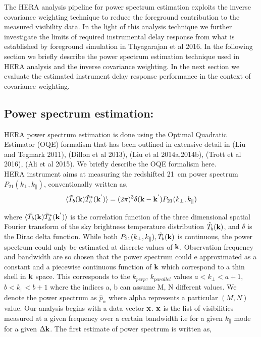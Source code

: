 \documentclass[twocolumn]{emulateapj}
\begin{document}
The HERA analysis pipeline for power spectrum estimation exploits the inverse covariance weighting technique to reduce the foreground contribution to the measured visibility data. In the light of this analysis technique we further investigate the limits of required instrumental delay response from what is established by foreground simulation in Thyagarajan et al 2016. In the following section we briefly describe the power spectrum estimation technique used in HERA analysis and the inverse covariance weighting. In the next section we evaluate the estimated instrument delay response performance in the context of covariance weighting.

\subsection{Power spectrum estimation:}
HERA power spectrum estimation is done using the Optimal Quadratic Estimator (OQE) formalism that has been outlined in extensive detail in (Liu and Tegmark 2011), (Dillon et al 2013), (Liu et al 2014a,2014b), (Trott et al 2016), (Ali et al 2015). We briefly  describe the OQE formalism here.\\
HERA instrument aims at measuring the redshifted 21~cm power spectrum $P_{21}(k_\perp,k_\parallel)$, conventionally written as, 
\begin{equation}
\langle  \tilde T_{b}(\bold k) \tilde T_{b}^{*}(\bold k^{'}) \rangle = (2\pi)^{3} \delta (\bold k - \bold k^{'})P_{21}(k_\perp,k_\parallel)
\end{equation}

where $\langle  \tilde T_{b}(\bold k) \tilde T_{b}^{*}(\bold k^{'}) \rangle $ is the correlation function of the three dimensional spatial Fourier transform of the sky brightness temperature distribution $ \tilde T_{b}(\bold k)$, and $\delta$ is the Dirac delta function. While both $P_{21}(k_\perp,k_\parallel), \tilde T_{b}({\bold k})$ is continuous, the power spectrum could only be estimated at discrete values of $\bold k$. Observation frequency and bandwidth are so chosen that the power spectrum could e approximated as a constant and a piecewise continuous function of $\bold k$  which correspond to a thin shell in $\bold k$ space. This corresponds to the $k_{perp}$, $k_{parallel}$  values $a <k_{\perp} < a+1$, $b <k_{\parallel} < b+1$ where the indices a, b can assume M, N different values.  We denote the power spectrum as $\hat p_{\alpha}$ where alpha represents a particular $(M,N)$ value. Our analysis begins with a data vector $\bold x$. $\bold x$ is the list of visibilities measured at a given frequency over a certain bandwidth i.e for a given $k_{\parallel}$ mode for a given $\Delta \bold k $. The first estimate of power spectrum is written as, 
\end{document}
